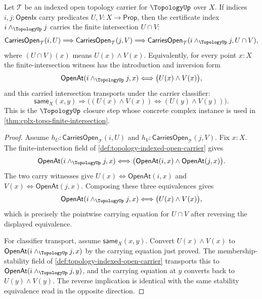\begin{theorem}
\label{thm:topology-indexed-open-finite-intersection}
Let $\mathcal{T}$ be an indexed open topology carrier for $\TopologyUp$ over $X$. If indices $i,j:\mathsf{OpenIx}$ carry predicates $U,V:X\to\mathsf{Prop}$, then the certificate index $i\wedge_{\TopologyUp}j$ carries the finite intersection $U\cap V$:
$$
\mathsf{CarriesOpen}_{\mathcal{T}}(i,U)
\Longrightarrow
\mathsf{CarriesOpen}_{\mathcal{T}}(j,V)
\Longrightarrow
\mathsf{CarriesOpen}_{\mathcal{T}}(i\wedge_{\TopologyUp}j,U\cap V),
$$
where $(U\cap V)(x)$ means $U(x)\wedge V(x)$. Equivalently, for every point $x:X$ the finite-intersection witness has the introduction and inversion form
$$
\mathsf{OpenAt}(i\wedge_{\TopologyUp}j,x)
\Longleftrightarrow
\bigl(U(x)\wedge V(x)\bigr),
$$
and this carried intersection transports under the carrier classifier:
$$
\mathsf{same}_X(x,y)
\Longrightarrow
\bigl((U(x)\wedge V(x))\Longleftrightarrow(U(y)\wedge V(y))\bigr).
$$
This is the $\TopologyUp$ closure step whose concrete complex instance is used in \autoref{thm:cplx-topo-finite-intersection}.
\end{theorem}
\begin{proof}
Assume $h_U:\mathsf{CarriesOpen}_{\mathcal{T}}(i,U)$ and $h_V:\mathsf{CarriesOpen}_{\mathcal{T}}(j,V)$. Fix $x:X$. The finite-intersection field of \autoref{def:topology-indexed-open-carrier} gives
$$
\mathsf{OpenAt}(i\wedge_{\TopologyUp}j,x)
\Longleftrightarrow
\bigl(\mathsf{OpenAt}(i,x)\wedge\mathsf{OpenAt}(j,x)\bigr).
$$
The two carry witnesses give $U(x)\Longleftrightarrow\mathsf{OpenAt}(i,x)$ and $V(x)\Longleftrightarrow\mathsf{OpenAt}(j,x)$. Composing these three equivalences gives
$$
\mathsf{OpenAt}(i\wedge_{\TopologyUp}j,x)
\Longleftrightarrow
\bigl(U(x)\wedge V(x)\bigr),
$$
which is precisely the pointwise carrying equation for $U\cap V$ after reversing the displayed equivalence.

For classifier transport, assume $\mathsf{same}_X(x,y)$. Convert $U(x)\wedge V(x)$ to $\mathsf{OpenAt}(i\wedge_{\TopologyUp}j,x)$ by the carrying equation just proved. The membership-stability field of \autoref{def:topology-indexed-open-carrier} transports this to $\mathsf{OpenAt}(i\wedge_{\TopologyUp}j,y)$, and the carrying equation at $y$ converts back to $U(y)\wedge V(y)$. The reverse implication is identical with the same stability equivalence read in the opposite direction.
\end{proof}

